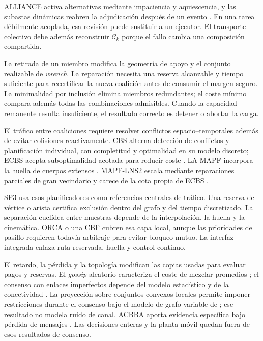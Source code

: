 ALLIANCE activa alternativas mediante impaciencia y aquiescencia, y las subastas dinámicas reabren la adjudicación después de un evento \parencite{parker1998alliance,nanjanath2006dynamicAuctions}. En una tarea débilmente acoplada, esa revisión puede sustituir a un ejecutor. El transporte colectivo debe además reconstruir \(\mathcal C_k\) porque el fallo cambia una composición compartida.

La retirada de un miembro modifica la geometría de apoyo y el conjunto realizable de \emph{wrench}. La reparación necesita una reserva alcanzable y tiempo suficiente para recertificar la nueva coalición antes de consumir el margen seguro. La minimalidad por inclusión elimina miembros redundantes; el coste mínimo compara además todas las combinaciones admisibles. Cuando la capacidad remanente resulta insuficiente, el resultado correcto es detener o abortar la carga.

El tráfico entre coaliciones requiere resolver conflictos espacio--temporales además de evitar colisiones reactivamente. CBS alterna detección de conflictos y planificación individual, con completitud y optimalidad en su modelo discreto; ECBS acepta suboptimalidad acotada para reducir coste \parencite{sharon2015cbs,barer2014ecbs}. LA-MAPF incorpora la huella de cuerpos extensos \parencite{li2019largeAgentMapf}. MAPF-LNS2 escala mediante reparaciones parciales de gran vecindario y carece de la cota propia de ECBS \parencite{li2022mapfLns2}.

SP3 usa esos planificadores como referencias centrales de tráfico. Una reserva de vértice o arista certifica exclusión dentro del grafo y del tiempo discretizado. La separación euclídea entre muestras depende de la interpolación, la huella y la cinemática. ORCA o una CBF cubren esa capa local, aunque las prioridades de pasillo requieren todavía arbitraje para evitar bloqueo mutuo. La interfaz integrada enlaza ruta reservada, huella y control continuo.

El retardo, la pérdida y la topología modifican las copias usadas para evaluar pagos y reservas. El \emph{gossip} aleatorio caracteriza el coste de mezclar promedios \parencite{boyd2006randomizedGossip}; el consenso con enlaces imperfectos depende del modelo estadístico y de la conectividad \parencite{kar2009imperfectConsensus}. La proyección sobre conjuntos convexos locales permite imponer restricciones durante el consenso bajo el modelo de grafo variable de \textcite{nedic2010constrainedConsensus}; ese resultado no modela ruido de canal. ACBBA aporta evidencia específica bajo pérdida de mensajes \parencite{rantanen2018lossyAcbba}. Las decisiones enteras y la planta móvil quedan fuera de esos resultados de consenso.

